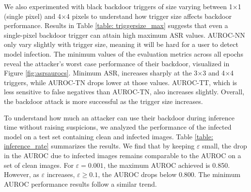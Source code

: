 \documentclass[letterpaper]{article} %
\begin{document}
We also experimented with black backdoor triggers of size varying between 1$\times$1 (single pixel) and 4$\times$4 pixels to understand how trigger size affects backdoor performance. Results in Table \ref{table: triggersize_max} suggests that even a single-pixel backdoor trigger can attain high maximum ASR values. AUROC-NN only  vary  slightly with trigger size, meaning it will be hard for a user to detect model infection. The minimum values of the evaluation metrics across all epochs reveal the attacker's worst case performance of their backdoor, visualized in Figure \ref{fig:asrsaurocs}. Minimum ASR, increases sharply at the 3$\times$3 and 4$\times$4 triggers, while AUROC-TN drops lower at those values. AUROC-TT, which is less sensitive to false negatives than AUROC-TN, also increases slightly. Overall, the backdoor attack is more successful as the trigger size increases.  

To understand how much an attacker can use their backdoor during inference time without raising suspicions, we analyzed the performance of the infected model on a test set containing clean and infected images. Table \ref{table: inference_rate} summarizes the results. We find that by keeping $\varepsilon$ small, the drop in the AUROC due to infected images remains comparable to the AUROC on a set of clean images. For $\varepsilon = 0.001$, the maximum AUROC achieved is 0.850. However, as $\varepsilon$ increases, $\varepsilon\geq 0.1$, the AUROC drops below 0.800. The minimum AUROC performance results follow a similar trend.  
 
\end{document}
